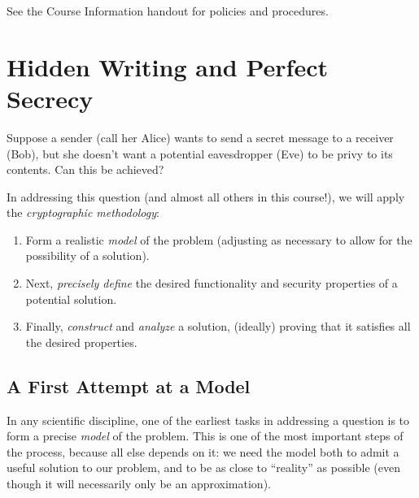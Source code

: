 \documentclass[11pt]{article}
\begin{document}
See the Course Information handout for policies and procedures.

\section{Hidden Writing and Perfect Secrecy}
\label{sec:hidd-writ-perf}

Suppose a sender (call her Alice) wants to send a secret message to a
receiver (Bob), but she doesn't want a potential eavesdropper (Eve) to
be privy to its contents.  Can this be achieved?

In addressing this question (and almost all others in this course!),
we will apply the \emph{cryptographic methodology}:
\begin{enumerate}
\item Form a realistic \emph{model} of the problem (adjusting
  as necessary to allow for the possibility of a solution).
\item Next, \emph{precisely define} the desired functionality and
  security properties of a potential solution.
\item Finally, \emph{construct} and \emph{analyze} a solution,
  (ideally) proving that it satisfies all the desired properties.
\end{enumerate}

\subsection{A First Attempt at a Model}
\label{sec:first-attempt}

In any scientific discipline, one of the earliest tasks in addressing
a question is to form a precise \emph{model} of the problem.  This is
one of the most important steps of the process, because all else
depends on it: we need the model both to admit a useful solution to
our problem, and to be as close to ``reality'' as possible (even
though it will necessarily only be an approximation).
\end{document}
